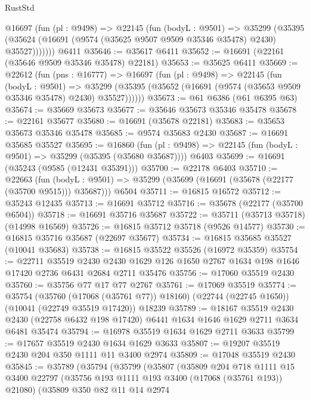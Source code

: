 \begin{lexlean}{RustStd}
\begin{coremodule}
      @16697
        (fun (pl : @9498) =>
        @22145
          (fun (bodyL : @9501) =>
          @35299
            (@35395 (@35624 (@16691 (@9574 (@35625 @9507 @9509 @35346 @35478) @2430) @35527)))))))
    @6411
@35646 := @35617 @6411
@35652 := @16691 (@22161 (@35646 @9509 @35346 @35478) @22181)
@35653 := @35625 @6411
@35669 := @22612
    (fun (pns : @16777) =>
    @16697
      (fun (pl : @9498) =>
      @22145
        (fun (bodyL : @9501) =>
        @35299 (@35395 (@35652 (@16691 (@9574 (@35653 @9509 @35346 @35478) @2430) @35527))))))
@35673 := @61 @6386 (@61 @6395 @63)
@35674 := @35669 @35673
@35677 := @35646 @35673 @35346 @35478
@35678 := @22161 @35677
@35680 := @16691 (@35678 @22181)
@35683 := @35653 @35673 @35346 @35478
@35685 := @9574 @35683 @2430
@35687 := @16691 @35685 @35527
@35695 := @16860
    (fun (pl : @9498) => @22145 (fun (bodyL : @9501) => @35299 (@35395 (@35680 @35687))))
    @6403
@35699 := @16691 (@35243 (@9585 (@12431 @35391)))
@35700 := @22178 @6403
@35710 := @22663
    (fun (bodyL : @9501) => @35299 (@35699 (@16691 (@35678 (@22177 (@35700 @9515))) @35687)))
    @6504
@35711 := @16815 @16572
@35712 := @35243 @12435
@35713 := @16691 @35712
@35716 := @35678 (@22177 (@35700 @6504))
@35718 := @16691 @35716 @35687
@35722 := @35711 (@35713 @35718) (@14998 @16569)
@35726 := @16815 @35712 @35718 (@9526 @14577)
@35730 := @16815 @35716 @35687 (@22697 @35677)
@35734 := @16815 @35685 @35527 (@10041 @35683)
@35738 := @16815 @35522 @35526 (@16972 @35359)
@35754 := @22711
    @35519
    @2430
    @2430
    @1629
    @126
    @1650
    @2767
    @1634
    @198
    @1646
    @17420
    @2736
    @6431
    @2684
    @2711
    @35476
@35756 := @17060 @35519 @2430
@35760 := @35756 @77 @17 @77 @2767
@35761 := @17069 @35519
@35774 := @35754
    (@35760 (@17068 (@35761 @77)) @18160)
    (@22744 (@22745 @1650))
    (@10041 (@22749 @35519 @17420))
    @18239
@35789 := @18167
    @35519
    @2430
    @2430
    (@22758 @6432 @198 @17420)
    @6441
    @1634
    @1646
    @1629
    @2711
    @3634
    @6481
    @35474
@35794 := @16978 @35519 @1634 @1629 @2711 @3633
@35799 := @17657 @35519 @2430 @1634 @1629 @3633
@35807 := @19207 @35519 @2430 @204 @350 @1111 @11 @3400 @2974
@35809 := @17048 @35519 @2430
@35845 := @35789
    (@35794
      (@35799
        (@35807
          (@35809
            @204
            @718
            @1111
            @15
            @3400
            @22797
            (@35756 @193 @1111 @193 @3400 (@17068 (@35761 @193)) @21080)
            (@35809
              @350
              @82
              @11
              @14
              @2974

\end{coremodule}
\end{lexlean}
